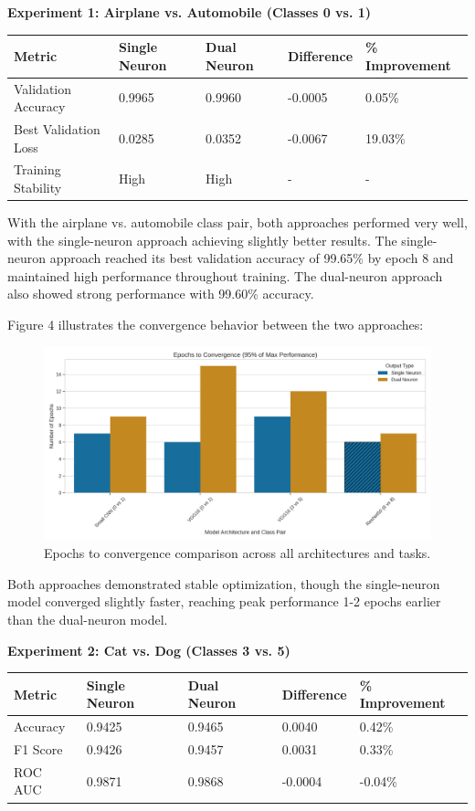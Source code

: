 \documentclass[11pt]{article}
\begin{document}
\textbf{Experiment 1: Airplane vs. Automobile (Classes 0 vs. 1)}

\begin{tabular}{lllll}
\hline
Metric & Single Neuron & Dual Neuron & Difference & \% Improvement \\
\hline
Validation Accuracy & 0.9965 & 0.9960 & -0.0005 & 0.05\% \\
Best Validation Loss & 0.0285 & 0.0352 & -0.0067 & 19.03\% \\
Training Stability & High & High & - & - \\
\hline
\end{tabular}

With the airplane vs. automobile class pair, both approaches performed very well, with the single-neuron approach achieving slightly better results. The single-neuron approach reached its best validation accuracy of 99.65\% by epoch 8 and maintained high performance throughout training. The dual-neuron approach also showed strong performance with 99.60\% accuracy.

Figure 4 illustrates the convergence behavior between the two approaches:

\begin{figure}[htbp]
\centering
\includegraphics[width=\textwidth]{figures/convergence_rate_comparison.png}
\caption{Epochs to convergence comparison across all architectures and tasks.}
\end{figure}

Both approaches demonstrated stable optimization, though the single-neuron model converged slightly faster, reaching peak performance 1-2 epochs earlier than the dual-neuron model.

\textbf{Experiment 2: Cat vs. Dog (Classes 3 vs. 5)}

\begin{tabular}{lllll}
\hline
Metric & Single Neuron & Dual Neuron & Difference & \% Improvement \\
\hline
Accuracy & 0.9425 & 0.9465 & 0.0040 & 0.42\% \\
F1 Score & 0.9426 & 0.9457 & 0.0031 & 0.33\% \\
ROC AUC & 0.9871 & 0.9868 & -0.0004 & -0.04\% \\
\hline
\end{tabular}
\end{document}

